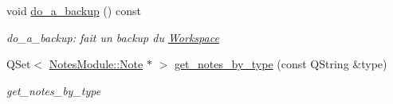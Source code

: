 \begin{DoxyCompactItemize}
void \hyperlink{classworkspace_1_1_workspace_a60ae23039c19c001adccecde4bec32e4}{do\-\_\-a\-\_\-backup} () const 
\begin{DoxyCompactList}\small\item\em do\-\_\-a\-\_\-backup\-: fait un backup du \hyperlink{classworkspace_1_1_workspace}{Workspace} \end{DoxyCompactList}\item 
Q\-Set$<$ \hyperlink{class_notes_module_1_1_note}{Notes\-Module\-::\-Note} $\ast$ $>$ \hyperlink{classworkspace_1_1_workspace_a215d03715ce946b346b4b6bb3280fbe9}{get\-\_\-notes\-\_\-by\-\_\-type} (const Q\-String \&type)
\begin{DoxyCompactList}\small\item\em get\-\_\-notes\-\_\-by\-\_\-type \end{DoxyCompactList}\end{DoxyCompactItemize}
